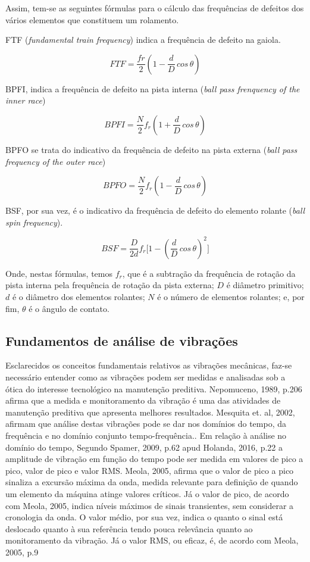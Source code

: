 \documentclass[
	12pt,				
	oneside,			
	a4paper,			
	english,			
	brazil				
	]{abntex2ppgsi}
\begin{document}
Assim, tem-se as seguintes fórmulas para o cálculo das frequências de defeitos dos vários  elementos que constituem um rolamento. 


FTF (\textit{fundamental train frequency}) indica a frequência de defeito na gaiola. 

\[FTF = \frac{fr}{2} \left ( 1 - \frac{d}{D} \,cos \, \theta \right )  \]

BPFI, indica a frequência de defeito na pista interna (\textit{ball pass frenquency of the inner race})

\[BPFI = \frac{N}{2}f_{r} \left ( 1 + \frac{d}{D} \,cos \, \theta \right )  \]

BPFO se trata do indicativo da frequência de defeito na pista externa (\textit{ball pass frequency of the outer race})

\[BPFO = \frac{N}{2}f_{r} \left ( 1 - \frac{d}{D} \,cos \, \theta \right )  \]

BSF, por sua vez, é o indicativo da frequência de defeito do elemento rolante (\textit{ball spin frequency}).

\[BSF = \frac{D}{2d}f_{r} \Bigg[  1 - \left ( \frac{d}{D} \,cos \, \theta \right ) ^{2}  \Bigg] \]

Onde, nestas fórmulas, temos $f_{r}$, que é a subtração da frequência de rotação da pista interna pela frequência de rotação da pista externa; $D$ é diâmetro primitivo; $d$ é o diâmetro dos elementos rolantes; $N$ é o número de elementos rolantes; e, por fim, $\theta$ é o ângulo de contato.

\subsection{\textbf{Fundamentos de análise de vibrações}}

Esclarecidos os conceitos fundamentais relativos as vibrações mecânicas, faz-se necessário entender como as vibrações podem ser medidas e analisadas sob a ótica do interesse tecnológico na manutenção preditiva. Nepomuceno, 1989, p.206 afirma que a medida e monitoramento da vibração é uma das atividades de manutenção preditiva que apresenta melhores resultados. 
Mesquita et. al, 2002, afirmam que análise destas vibrações pode se dar nos domínios do tempo, da frequência e no domínio conjunto tempo-frequência..
Em relação à análise no domínio do tempo, Segundo Spamer, 2009, p.62 apud Holanda, 2016, p.22 a amplitude de vibração em função do tempo pode ser medida em valores de pico a pico, valor de pico e valor RMS. 
Meola, 2005, afirma que o valor de pico a pico sinaliza a excursão máxima da onda, medida relevante para definição de quando um elemento da máquina atinge valores críticos. 
Já o valor de pico, de acordo com Meola, 2005, indica níveis máximos de sinais transientes, sem considerar a cronologia da onda. 
O valor médio, por sua vez, indica o quanto o sinal está deslocado quanto à sua referência tendo pouca relevância quanto ao monitoramento da vibração. 
Já o valor RMS, ou eficaz, é, de acordo com Meola, 2005, p.9
\end{document}
